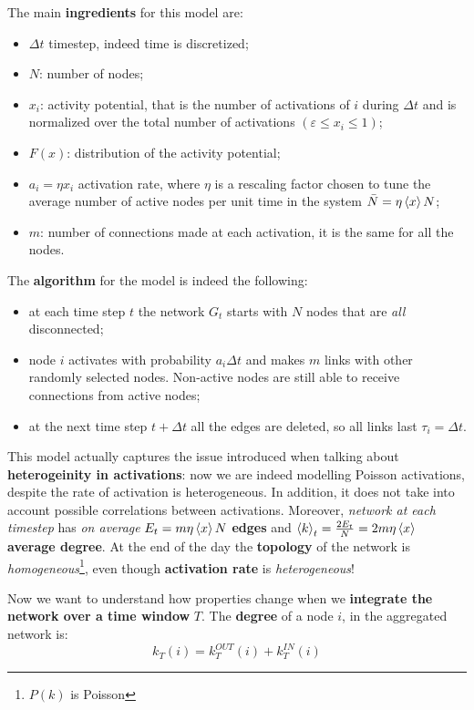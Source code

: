 \documentclass[../main/main.tex]{subfiles}
\begin{document}
The main \textbf{ingredients} for this model are:
\begin{itemize}
    \item $\Delta t$ timestep, indeed time is discretized;
    \item $N$: number of nodes;
    \item $x_i$: activity potential, that is the number of activations of $i$ during $\Delta t$ and is normalized over the total number of activations $(\varepsilon \leqslant x_i \leqslant 1)$;
    \item $F(x)$: distribution of the activity potential;
    \item $a_i = \eta x_i$ activation rate, where $\eta$ is a rescaling factor chosen to tune the average number of active nodes per unit time in the system $\bar{N} = \eta\expval{x}N$;
    \item $m$: number of connections made at each activation, it is the same for all the nodes.
\end{itemize}
The \textbf{algorithm} for the model is indeed the following:
\begin{itemize}
    \item at each time step $t$ the network $G_t$ starts with $N$ nodes that are \textit{all} disconnected;
    \item node $i$ activates with probability $a_i \Delta t$ and makes $m$ links with other randomly selected nodes. Non-active nodes are still able to receive connections from active nodes;
    \item at the next time step $t + \Delta t$ all the edges are deleted, so all links last $\tau_i = \Delta t$.
\end{itemize}
This model actually captures the issue introduced when talking about \textbf{heterogeinity in activations}: now we are indeed modelling Poisson activations, despite the rate of activation is heterogeneous.
In addition, it does not take into account possible correlations between activations.
Moreover, \textit{network at each timestep} has \textit{on average} $E_t = m \eta \expval{x} N$ \textbf{edges} and $\expval{k}_t = \frac{2E_t}{N} = 2 m \eta \expval{x}$ \textbf{average degree}. At the end of the day the \textbf{topology} of the network is \textit{homogeneous}\footnote{$P(k)$ is Poisson}, even though \textbf{activation rate} is \textit{heterogeneous}!


Now we want to understand how properties change when we \textbf{integrate the network over a time window} $T$. The \textbf{degree} of a node $i$, in the aggregated network is:
\begin{equation}
    k_T(i) = k_T^{OUT} (i) + k_T^{IN}(i)
\end{equation}
\end{document}
